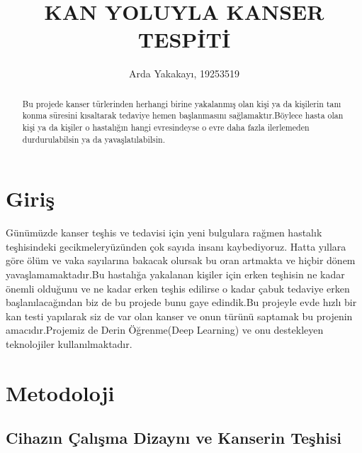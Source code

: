 \documentclass[isoft]{ssltexposter}
\title{KAN YOLUYLA KANSER TESPİTİ}
\author{\ding{118} Arda Yakakayı, 19253519 \ding{118}\\}
\begin{document}
\begin{poster}
                    
                    
    

    \begin{abstract}
       \normalsize
      Bu projede  kanser türlerinden\cite{cancertypes} herhangi birine yakalanmış olan kişi ya da kişilerin tanı konma süresini kısaltarak tedaviye hemen başlanmasını sağlamaktır.Böylece hasta olan kişi ya da kişiler o hastalığın hangi evresindeyse o evre daha fazla ilerlemeden durdurulabilsin ya da yavaşlatılabilsin.
    \end{abstract}


    \section{Giriş}
    Günümüzde kanser teşhis ve tedavisi için  yeni bulgulara rağmen hastalık teşhisindeki gecikmeler\cite{hardtodetect}yüzünden çok sayıda insanı kaybediyoruz. 
    Hatta yıllara göre ölüm ve vaka sayılarına bakacak olursak bu oran artmakta ve hiçbir dönem yavaşlamamaktadır.Bu hastalığa yakalanan kişiler için erken teşhisin ne kadar önemli olduğunu ve ne kadar erken teşhis edilirse o kadar çabuk tedaviye erken başlanılacağından biz de bu projede bunu gaye edindik.Bu projeyle evde hızlı bir kan testi yapılarak siz de var olan kanser ve onun türünü saptamak bu projenin amacıdır.Projemiz de Derin Öğrenme(Deep Learning) ve onu destekleyen teknolojiler kullanılmaktadır.

\section{Metodoloji}


    \subsection{Cihazın Çalışma Dizaynı ve Kanserin Teşhisi}
        

\end{poster}
\end{document}

